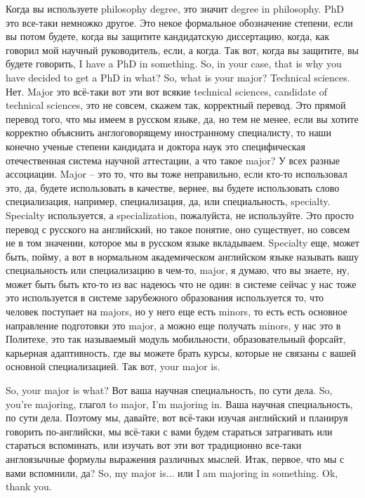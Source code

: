 \documentclass[main.tex]{subfiles}
\begin{document}
Когда вы используете philosophy degree, это значит degree in philosophy.
PhD это все-таки немножко другое.
Это некое формальное обозначение степени, если вы потом будете, когда вы защитите кандидатскую диссертацию, когда, как говорил мой научный руководитель, если, а когда.
Так вот, когда вы защитите, вы будете говорить, I have a PhD in something.
So, in your case, that is why you have decided to get a PhD in what? So, what is your major? Technical sciences.
Нет.
Major это всё-таки вот эти вот всякие technical sciences, candidate of technical sciences, это не совсем, скажем так, корректный перевод.
Это прямой перевод того, что мы имеем в русском языке, да, но тем не менее, если вы хотите корректно объяснить англоговорящему иностранному специалисту, то наши конечно ученые степени кандидата и доктора наук это специфическая отечественная система научной аттестации, а что такое major? У всех разные ассоциации.
Major -- это то, что вы тоже неправильно, если кто-то использовал это, да, будете использовать в качестве, вернее, вы будете использовать слово специализация, например, специализация, да, или специальность, specialty.
Specialty используется, а specialization, пожалуйста, не используйте.
Это просто перевод с русского на английский, но такое понятие, оно существует, но совсем не в том значении, которое мы в русском языке вкладываем.
Specialty еще, может быть, пойму, а вот в нормальном академическом английском языке называть вашу специальность или специализацию в чем-то, major, я думаю, что вы знаете, ну, может быть быть кто-то из вас надеюсь что не один: в системе сейчас у нас тоже это используется в системе зарубежного образования используется то, что человек поступает на majors, но у него еще есть minors, то есть есть основное направление подготовки это major, а можно еще получать minors, у нас это в Политехе, это так называемый модуль мобильности, образовательный форсайт, карьерная адаптивность, где вы можете брать курсы, которые не связаны с вашей основной специализацией.
Так вот, your major is.

So, your major is what? Вот ваша научная специальность, по сути дела.
So, you're majoring, глагол to major, I'm majoring in.
Ваша научная специальность, по сути дела.
Поэтому мы, давайте, вот всё-таки изучая английский и планируя говорить по-английски, мы всё-таки с вами будем стараться затрагивать или стараться вспоминать, или изучать вот эти вот традиционно все-таки англоязычные формулы выражения различных мыслей.
Итак, первое, что мы с вами вспомнили, да?
So, my major is... или I am majoring in something.
Ok, thank you.
\end{document}
